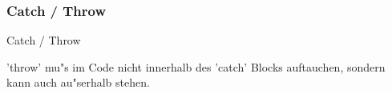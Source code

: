 \documentclass{beamer}
\begin{document}
\begin{frame}
  \frametitle{Catch / Throw}
  Catch / Throw
  
\pause
\vspace{3ex}'throw' mu"s im Code nicht innerhalb des 'catch' Blocks auftauchen, sondern kann auch au"serhalb stehen.
\end{frame}

\end{document}
